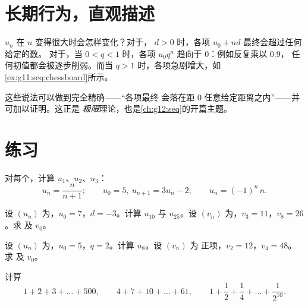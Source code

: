\section{长期行为，直观描述}

$u_n$ 在 $n$ 变得很大时会怎样变化？对于，
 $d > 0$ 时，各项 $u_0 + nd$ 最终会超过任何给定的数。
对于，当 $0 < q < 1$ 时，各项
$u_0 q^n$ 趋向于 $0$：例如反复乘以 $0.9$，
任何初值都会被逐步削弱。而当 $q > 1$ 时，各项急剧增大，如
\cref{ex:g11:seq:chessboard}所示。

\begin{remark}
这些说法可以做到完全精确——“各项最终
会落在距 $0$ 任意给定距离之内”——并可加以证明。这正是
\emph{极限}理论，也是\cref{ch:g12:seq}的开篇主题。
\end{remark}

\section{练习}

\begin{exercise}[$\star$]\label{exo:g11:seq:1}
对每个，计算 $u_1$、$u_2$、$u_3$：
\[
u_n = \frac{n}{n+1}; \qquad
u_0 = 5,\ u_{n+1} = 3u_n - 2; \qquad
u_n = (-1)^n\,n .
\]
\end{exercise}

\begin{exercise}[$\star$]\label{exo:g11:seq:2}
设 $(u_n)$ 为，$u_0 = 7$，$d = -3$。计算 $u_{10}$ 与
$u_{25}$。设 $(v_n)$ 为，$v_3 = 11$，$v_8 = 26$。求
及 $v_0$。
\end{exercise}

\begin{exercise}[$\star$]\label{exo:g11:seq:3}
设 $(u_n)$ 为，$u_0 = 5$，$q = 2$。计算 $u_8$。设 $(v_n)$ 为
正项，$v_2 = 12$，$v_4 = 48$。求
及 $v_0$。
\end{exercise}

\begin{exercise}[$\star$]\label{exo:g11:seq:4}
计算
\[
1 + 2 + 3 + \dots + 500, \qquad
4 + 7 + 10 + \dots + 61, \qquad
1 + \frac12 + \frac14 + \dots + \frac{1}{2^{10}} .
\]
\end{exercise}

